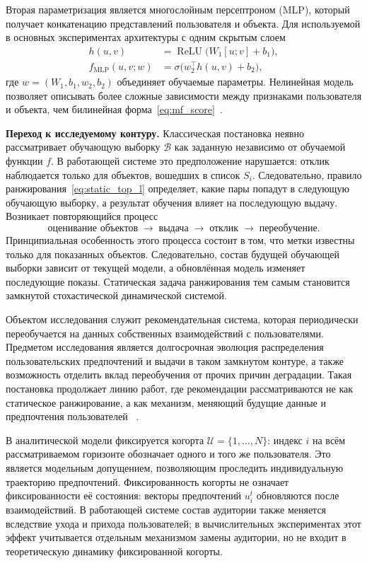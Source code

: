 Вторая параметризация является многослойным персептроном (MLP), который
получает конкатенацию представлений пользователя и объекта. Для используемой в
основных экспериментах архитектуры с одним скрытым слоем
\begin{equation}
    \begin{aligned}
        h(u,v)&=\operatorname{ReLU}\bigl(W_1[u;v]+b_1\bigr),\\
        f_{\mathrm{MLP}}(u,v;w)
        &=\sigma\bigl(w_2^\top h(u,v)+b_2\bigr),
    \end{aligned}
    \label{eq:mlp_score}
\end{equation}
где $w=(W_1,b_1,w_2,b_2)$ объединяет обучаемые параметры. Нелинейная модель
позволяет описывать более сложные зависимости между признаками пользователя и
объекта, чем билинейная форма~\eqref{eq:mf_score}~\cite{he2017}.

\textbf{Переход к исследуемому контуру.} Классическая постановка
неявно рассматривает обучающую выборку $\mathcal B$ как заданную независимо от
обучаемой функции $f$. В работающей системе это предположение нарушается:
отклик наблюдается только для объектов, вошедших в список $S_i$. Следовательно,
правило ранжирования~\eqref{eq:static_top_l} определяет, какие пары попадут в
следующую обучающую выборку, а результат обучения влияет на последующую выдачу.
Возникает повторяющийся процесс
\[
    \text{оценивание объектов}
    \;\longrightarrow\;
    \text{выдача}
    \;\longrightarrow\;
    \text{отклик}
    \;\longrightarrow\;
    \text{переобучение}.
\]
Принципиальная особенность этого процесса состоит в том, что метки известны
только для показанных объектов. Следовательно, состав будущей обучающей выборки
зависит от текущей модели, а обновлённая модель изменяет последующие показы.
Статическая задача ранжирования тем самым становится замкнутой стохастической
динамической системой.

Объектом исследования служит рекомендательная система, которая периодически
переобучается на данных собственных взаимодействий с пользователями. Предметом
исследования является долгосрочная эволюция распределения пользовательских
предпочтений и выдачи в таком замкнутом контуре, а также возможность отделить
вклад переобучения от прочих причин деградации. Такая постановка продолжает
линию работ, где рекомендации рассматриваются не как статическое ранжирование, а
как механизм, меняющий будущие данные и предпочтения пользователей
~\cite{perdomo2020, carroll2022, brown2022stateful}.

В аналитической модели фиксируется когорта
$\mathcal U=\{1,\ldots,N\}$: индекс $i$ на всём рассматриваемом горизонте
обозначает одного и того же пользователя. Это является модельным допущением,
позволяющим проследить индивидуальную траекторию предпочтений. Фиксированность
когорты не означает фиксированности её состояния: векторы предпочтений
$u_i^t$ обновляются после взаимодействий. В работающей системе состав аудитории
также меняется вследствие ухода и прихода пользователей; в вычислительных
экспериментах этот эффект учитывается отдельным механизмом замены аудитории, но
не входит в теоретическую динамику фиксированной когорты.

